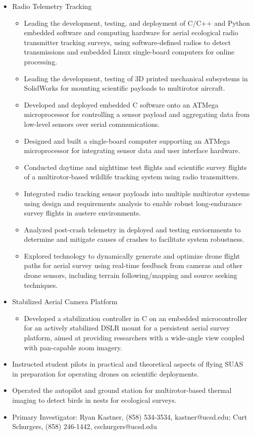 \documentclass[line,margin]{res}
\begin{document}
\begin{resume}
\begin{itemize}
\begin{itemize}
		\end{itemize}
		\item Radio Telemetry Tracking
		\begin{itemize}
			\item Leading the development, testing, and deployment of C/C++ and Python embedded software and computing hardware for aerial ecological radio transmitter tracking surveys, using software-defined radios to detect transmissions and embedded Linux single-board computers for online processing.
			\item Leading the development, testing of 3D printed mechanical subsystems in SolidWorks for mounting scientific payloads to multirotor aircraft.
			\item Developed and deployed embedded C software onto an ATMega microprocessor for controlling a sensor payload and aggregating data from low-level sensors over serial communications.
			\item Designed and built a single-board computer supporting an ATMega microprocessor for integrating sensor data and user interface hardware.
			\item Conducted daytime and nighttime test flights and scientific survey flights of a multirotor-based wildlife tracking system using radio transmitters.
			\item Integrated radio tracking sensor payloads into multiple multirotor systems using design and requirements analysis to enable robust long-endurance survey flights in austere environments.
			\item Analyzed post-crash telemetry in deployed and testing enviornments to determine and mitigate causes of crashes to facilitate system robustness.
			\item Explored technology to dynamically generate and optimize drone flight paths for aerial survey using real-time feedback from cameras and other drone sensors, including terrain following/mapping and source seeking techniques.
		\end{itemize}
		\item Stabilized Aerial Camera Platform
		\begin{itemize}
			\item Developed a stabilization controller in C on an embedded microcontroller for an actively stabilized DSLR mount for a persistent aerial survey platform, aimed at providing researchers with a wide-angle view coupled with pan-capable zoom imagery.
		\end{itemize}
		\item Instructed student pilots in practical and theoretical aspects of flying SUAS in preparation for operating drones on scientific deployments.
		\item Operated the autopilot and ground station for multirotor-based thermal imaging to detect birds in nests for ecological surveys.
		\item Primary Investigator: Ryan Kastner, (858) 534-3534, kastner@ucsd.edu; Curt Schurgers, (858) 246-1442, cschurgers@ucsd.edu
	\end{itemize}


\end{resume}
\end{document}
